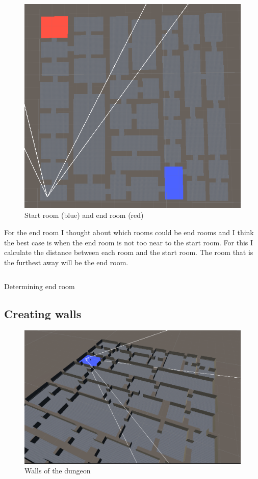\documentclass[a4paper,11pt,oneside]{scrreprt}
\begin{document}
\begin{figure}[ht]
	\centering
	\includegraphics[scale=0.5]{images/start_end_room.png}   
	\caption{Start room (blue) and end room (red)}
	\label{fig:start-end-room}
\end{figure}

For the end room I thought about which rooms could be end rooms and I think the best case is when the end room is not too near to the start room. For this I calculate the distance between each room and the start room. The room that is the furthest away will be the end room.
\\
\begin{listing}[ht]
    \inputminted[fontsize=\footnotesize,linenos]{csharp}{code/EndRoom.cs}
    \caption[Determining end room]{Determining end room}
    \label{code:Determining-end-room}
\end{listing}

\subsection{Creating walls}
\label{subsection:creating-walls}
\begin{figure}[htb]
	\centering
	\includegraphics[scale=0.4]{images/walls.png}   
	\caption{Walls of the dungeon}
	\label{fig:walls}
\end{figure}
\end{document}
